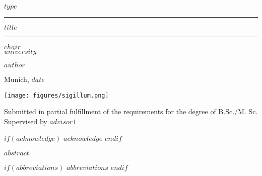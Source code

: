 \documentclass[12pt]{article}
\newcommand{\mytitle}{$title$}
\begin{document}

\begin{titlepage}
\begin{center}

\LARGE
$type$

\vspace{0.5cm}

\rule{\textwidth}{1.5pt}
\LARGE
\textbf{\mytitle}
\rule{\textwidth}{1.5pt}

\vspace{0.5cm}

\large
$chair$ \\
$university$

\vfill

\Large
\textbf{$author$}

\vfill

\large
Munich, $date$

\vfill

\texttt{[image: figures/sigillum.png]}

\vfill

\normalsize
Submitted in partial fulfillment of the requirements for the degree of B.Sc./M. Sc.
\\

Supervised by $advisor1$

\end{center}
\end{titlepage}


\newpage

$if(acknowledge)$
\newpage
$acknowledge$
$endif$
\pagestyle{plain}
\setcounter{page}{1}    %

\newpage
$abstract$

\newpage
\tableofcontents
\clearpage

$if(abbreviations)$
\newpage
$abbreviations$
$endif$
\end{document}
